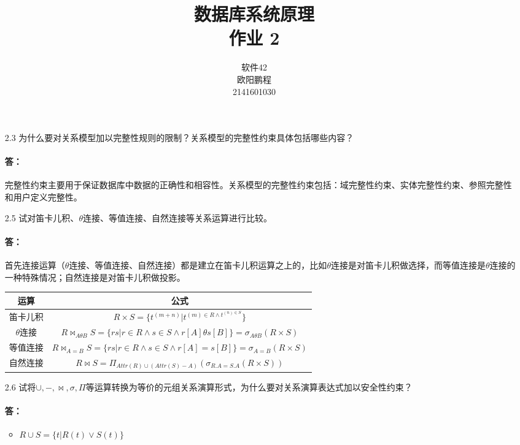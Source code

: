 \documentclass[UTF8]{ctexart}
\title{数据库系统原理 \\ 作业 2}
\author{软件42 \\ 欧阳鹏程 \\ 2141601030}
\begin{document}
\maketitle

\begin{itemize}
	\item[2.3] 为什么要对关系模型加以完整性规则的限制？关系模型的完整性约束具体包括哪些内容？
	\paragraph{答：}完整性约束主要用于保证数据库中数据的正确性和相容性。关系模型的完整性约束包括：域完整性约束、实体完整性约束、参照完整性和用户定义完整性。
	
	\item[2.5] 试对笛卡儿积、$\theta$连接、等值连接、自然连接等关系运算进行比较。
	\paragraph{答：}首先连接运算（$\theta$连接、等值连接、自然连接）都是建立在笛卡儿积运算之上的，比如$\theta$连接是对笛卡儿积做选择，而等值连接是$\theta$连接的一种特殊情况；自然连接是对笛卡儿积做投影。
	
	\begin{center}
		\begin{tabular}{|c|c|}
			\hline
			运算 & 公式 \\\hline
			笛卡儿积 & $R \times S = \{t^{(m+n)}| t^{(m) \in R \wedge t^{(n) \in S}}\}$ \\\hline
			
			$\theta$连接 & $R \bowtie_{A \theta B} S = \{rs|r \in R \wedge s \in S \wedge r[A] \theta s[B]\} = \sigma_{A \theta B}(R \times S)$ \\\hline
			
			等值连接 & $R \bowtie_{A = B} S = \{rs|r \in R \wedge s \in S \wedge r[A] = s[B]\} = \sigma_{A = B}(R \times S)$ \\\hline
			
			自然连接 & $R \bowtie S = \Pi_{Attr(R) \cup (Attr(S) - A)}(\sigma_{R.A = S.A}(R \times S))$ \\\hline
		\end{tabular}
	\end{center}
	
	\item[2.6] 试将$\cup, -, \bowtie, \sigma, \Pi$等运算转换为等价的元组关系演算形式，为什么要对关系演算表达式加以安全性约束？
	\paragraph{答：}
	\begin{itemize}
		\item $R \cup S = \{t|R(t) \vee S(t)\}$
		

\end{itemize}
\end{itemize}
\end{document}
